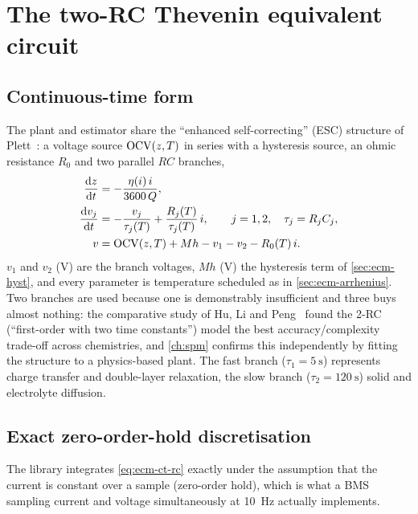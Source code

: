 \section{The two-RC Thevenin equivalent circuit}
\label{sec:ecm-thevenin}

\subsection{Continuous-time form}
The plant and estimator share the ``enhanced self-correcting'' (ESC) structure of
Plett~\cite{plett2004ekf1,plett2015bms1}: a voltage source $\mathrm{OCV}(z,T)$ in series with a
hysteresis source, an ohmic resistance $R_0$ and two parallel $RC$ branches,
\begin{align}
\frac{\mathrm{d}z}{\mathrm{d}t} &= -\frac{\eta(i)\,i}{3600\,Q}, \label{eq:ecm-ct-soc}\\
\frac{\mathrm{d}v_j}{\mathrm{d}t} &= -\frac{v_j}{\tau_j(T)} + \frac{R_j(T)}{\tau_j(T)}\,i,
 \qquad j=1,2, \quad \tau_j = R_j C_j, \label{eq:ecm-ct-rc}\\
v &= \mathrm{OCV}(z,T) + M h - v_1 - v_2 - R_0(T)\,i. \label{eq:ecm-ct-out}
\end{align}
$v_1$ and $v_2$ (\si{\volt}) are the branch voltages, $M h$ (\si{\volt}) the hysteresis term of
\cref{sec:ecm-hyst}, and every parameter is temperature scheduled as in
\cref{sec:ecm-arrhenius}. Two branches are used because one is demonstrably insufficient and
three buys almost nothing: the comparative study of Hu, Li and Peng~\cite{hu2012comparative}
found the 2-RC (``first-order with two time constants'') model the best accuracy/complexity
trade-off across chemistries, and \cref{ch:spm} confirms this independently by fitting the
structure to a physics-based plant. The fast branch ($\tau_1 = \SI{5}{\second}$) represents
charge transfer and double-layer relaxation, the slow branch ($\tau_2 = \SI{120}{\second}$) solid
and electrolyte diffusion.

\subsection{Exact zero-order-hold discretisation}
\label{sec:ecm-zoh}
The library integrates \eqref{eq:ecm-ct-rc} exactly under the assumption that the current is
constant over a sample (zero-order hold), which is what a BMS sampling current and voltage
simultaneously at \SI{10}{\hertz} actually implements.

